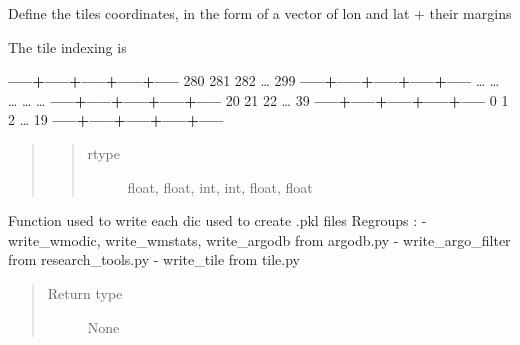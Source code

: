 \documentclass[letterpaper,10pt,english]{sphinxmanual}
\begin{document}

\begin{fulllineitems}
\label{\detokenize{pargopy:pargopy.argotools.tile_definition}}
Define the tiles coordinates, in the form of a vector of lon and
lat + their margins

The tile indexing is

{\color{red}\bfseries{}\textbar{}-----+-----+-----+-----+-----\textbar{}}
\textbar{} 280 \textbar{} 281 \textbar{} 282 \textbar{} … \textbar{} 299 \textbar{}
{\color{red}\bfseries{}\textbar{}-----+-----+-----+-----+-----\textbar{}}
\textbar{} … \textbar{} … \textbar{} … \textbar{} … \textbar{} … \textbar{}
{\color{red}\bfseries{}\textbar{}-----+-----+-----+-----+-----\textbar{}}
\textbar{}  20 \textbar{}  21 \textbar{}  22 \textbar{} … \textbar{}  39 \textbar{}
{\color{red}\bfseries{}\textbar{}-----+-----+-----+-----+-----\textbar{}}
\textbar{}   0 \textbar{}   1 \textbar{}   2 \textbar{} … \textbar{}  19 \textbar{}
{\color{red}\bfseries{}\textbar{}-----+-----+-----+-----+-----\textbar{}}
\begin{quote}
\begin{quote}\begin{description}
\item[{rtype}] \leavevmode
float, float, int, int, float, float

\end{description}\end{quote}
\end{quote}

\end{fulllineitems}


\begin{fulllineitems}
\label{\detokenize{pargopy:pargopy.argotools.write_dic}}
Function used to write each dic used to create .pkl files
Regroups :
- write\_wmodic, write\_wmstats, write\_argodb from argodb.py
- write\_argo\_filter from research\_tools.py
- write\_tile from tile.py
\begin{quote}\begin{description}
\item[{Return type}] \leavevmode
None

\end{description}\end{quote}

\end{fulllineitems}
\end{document}
